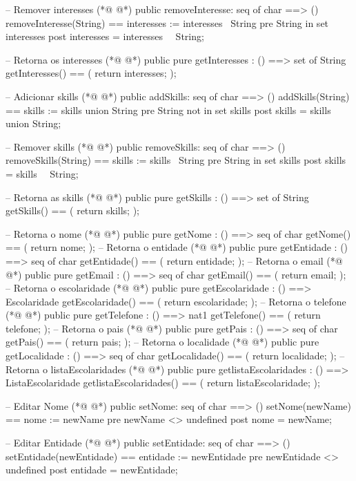 \begin{vdmpp}[breaklines=true]
 -- Remover interesses
(*@
\label{removeInteresse:76}
@*)
 public removeInteresse: seq of char ==> ()
 removeInteresse(String) == interesses := interesses \ {String}
 pre String in set interesses
 post interesses = interesses~ \ {String};
 
 -- Retorna os interesses
(*@
\label{getInteresses:82}
@*)
 public pure getInteresses : () ==> set of String
 getInteresses() ==
 (
  return interesses;
 );
 
 -- Adicionar skills
(*@
\label{addSkills:89}
@*)
 public addSkills: seq of char ==> ()
 addSkills(String) == skills := skills union {String}
 pre String not in set skills
 post skills = skills~ union {String};
 
 -- Remover skills
(*@
\label{removeSkills:95}
@*)
 public removeSkills: seq of char ==> ()
 removeSkills(String) == skills := skills \ {String}
 pre String in set skills
 post skills = skills~ \ {String};
 
 -- Retorna as skills
(*@
\label{getSkills:101}
@*)
 public pure getSkills : () ==> set of String
 getSkills() ==
 (
  return skills;
 );
 
 -- Retorna o nome
(*@
\label{getNome:108}
@*)
 public pure getNome : () ==> seq of char
 getNome() ==
 (
  return nome;
 );
 -- Retorna o entidade
(*@
\label{getEntidade:114}
@*)
 public pure getEntidade : () ==> seq of char
 getEntidade() ==
 (
  return entidade;
 );
 -- Retorna o email
(*@
\label{getEmail:120}
@*)
 public pure getEmail : () ==> seq of char
 getEmail() ==
 (
  return email;
 );
 -- Retorna o escolaridade
(*@
\label{getEscolaridade:126}
@*)
 public pure getEscolaridade : () ==> Escolaridade
 getEscolaridade() ==
 (
  return escolaridade;
 );
 -- Retorna o telefone
(*@
\label{getTelefone:132}
@*)
 public pure getTelefone : () ==> nat1
 getTelefone() ==
 (
  return telefone;
 );
 -- Retorna o pais
(*@
\label{getPais:138}
@*)
 public pure getPais : () ==> seq of char
 getPais() ==
 (
  return pais;
 );
 -- Retorna o localidade
(*@
\label{getLocalidade:144}
@*)
 public pure getLocalidade : () ==> seq of char
 getLocalidade() ==
 (
  return localidade;
 );
 -- Retorna o listaEscolaridades
(*@
\label{getlistaEscolaridades:150}
@*)
 public pure getlistaEscolaridades : () ==> ListaEscolaridade
 getlistaEscolaridades() ==
 (
  return listaEscolaridade;
 );
 
 -- Editar Nome
(*@
\label{setNome:157}
@*)
 public setNome: seq of char ==> ()
 setNome(newName) == nome := newName
 pre newName <> undefined
 post nome = newName;
 
 -- Editar Entidade
(*@
\label{setEntidade:163}
@*)
 public setEntidade: seq of char ==> ()
 setEntidade(newEntidade) == entidade := newEntidade
 pre newEntidade <> undefined
 post entidade = newEntidade;
 

\end{vdmpp}
